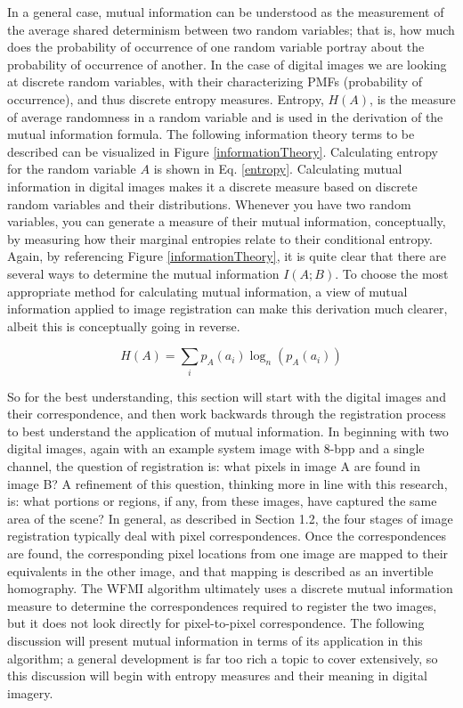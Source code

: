 In a general case, mutual information can be understood as the measurement of the average shared determinism between two random variables; that is, how much does the probability of occurrence of one random variable portray about the probability of occurrence of another. In the case of digital images we are looking at discrete random variables, with their characterizing PMFs (probability of occurrence), and thus discrete entropy measures. Entropy, $H(A)$, is the measure of average randomness in a random variable and is used in the derivation of the mutual information formula. The following information theory terms to be described can be visualized in Figure \ref{informationTheory}. Calculating entropy for the random variable $A$ is shown in Eq. \ref{entropy}. Calculating mutual information in digital images makes it a discrete measure based on discrete random variables and their distributions. Whenever you have two random variables, you can generate a measure of their mutual information, conceptually, by measuring how their marginal entropies relate to their conditional entropy. Again, by referencing Figure \ref{informationTheory}, it is quite clear that there are several ways to determine the mutual information $I(A;B)$. To choose the most appropriate method for calculating mutual information, a view of mutual information applied to image registration can make this derivation much clearer, albeit this is conceptually going in reverse.

\begin{equation}
\label{entropy}
	H(A) = \sum_{i}{p_{A}(a_{i}) \log_{n}{\left(p_{A}(a_{i})\right)}}
\end{equation}

So for the best understanding, this section will start with the digital images and their correspondence, and then work backwards through the registration process to best understand the application of mutual information. In beginning with two digital images, again with an example system image with 8-bpp and a single channel, the question of registration is: what pixels in image A are found in image B? A refinement of this question, thinking more in line with this research, is: what portions or regions, if any, from these images, have captured the same area of the scene? In general, as described in Section 1.2, the four stages of image registration typically deal with pixel correspondences. Once the correspondences are found, the corresponding pixel locations from one image are mapped to their equivalents in the other image, and that mapping is described as an invertible homography. The WFMI algorithm ultimately uses a discrete mutual information measure to determine the correspondences required to register the two images, but it does not look directly for pixel-to-pixel correspondence. The following discussion will present mutual information in terms of its application in this algorithm; a general development is far too rich a topic to cover extensively, so this discussion will begin with entropy measures and their meaning in digital imagery.

